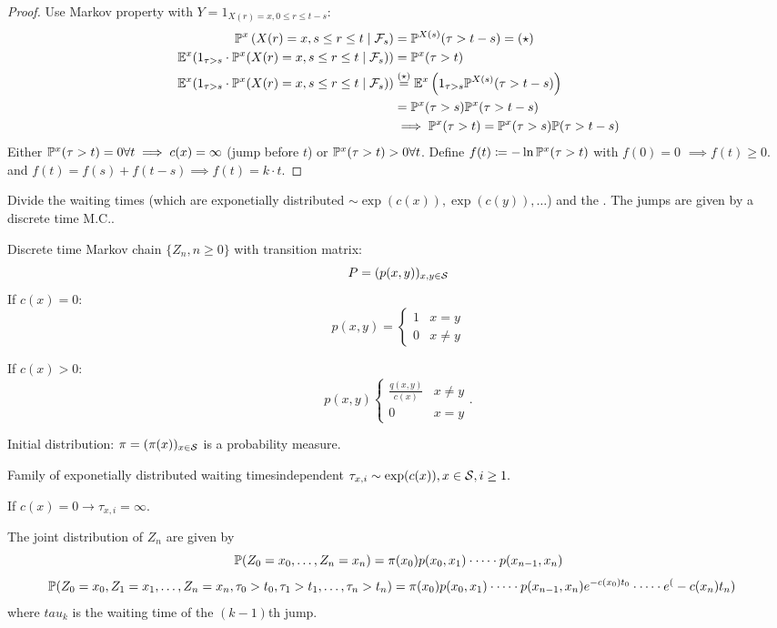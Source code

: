 \begin{proof}
    Use Markov property with \(Y=1_{X(r)=x,0\leq r\leq t-s}\):
    \begin{align*}
        \mathbb{P}^x\left(X(r)=x,s\leq r\leq t\mid \mathcal{F}_s\right)&=\mathbb{P}^{X(s)}(\tau>t-s)=(\star)\\
        \mathbb{E}^x(1_{\tau>s}\cdot \mathbb{P}^x(X(r)=x,s\leq r \leq t\mid \mathcal{F}_s))&=\mathbb{P}^x(\tau>t)\\
        \mathbb{E}^x(1_{\tau>s}\cdot \mathbb{P}^x(X(r)=x,s\leq r \leq t\mid \mathcal{F}_s))&\stackrel{(\star)}{=}\mathbb{E}^x\left(1_{\tau>s}\mathbb{P}^{X(s)}(\tau>t-s)\right)\\
        &=\mathbb{P}^x(\tau>s)\mathbb{P}^x(\tau>t-s)\\
        &\implies \mathbb{P}^x(\tau>t)=\mathbb{P}^x(\tau>s)\mathbb{P}(\tau>t-s)
    \end{align*}
    Either \(\mathbb{P}^x(\tau>t)=0\forall t\implies c(x)=\infty\) (jump before \(t\)) or \(\mathbb{P}^x(\tau>t)>0\forall t\).
    Define \(f(t)\coloneqq -\ln\mathbb{P}^x(\tau >t)\) with \(f(0)=0\) \(\implies f(t) \geq 0\).
    and  \(f(t)=f(s)+f(t-s)\implies f(t)=k\cdot t\).
\end{proof}

 Divide the waiting times (which are exponetially distributed \(\sim \exp(c(x)),\exp(c(y)),\dots\)) and the .
The jumps are given by a discrete time M.C..  

 Discrete time Markov chain \(\{Z_n,n\geq 0\}\) with transition matrix:
\[P=(p(x,y))_{x,y\in\mathcal{S}}\]
If \(c(x)=0\):\[ p(x,y)=\begin{cases}
   1&x=y\\ 
    0&x\neq y
\end{cases}\]

If \(c(x)>0\):
\[p(x,y)\begin{cases}
    \frac{q(x,y)}{c(x)} & x\neq y\\
    0 & x=y
\end{cases}.\]

 Initial distribution: \(\pi=(\pi(x))_{x\in\mathcal{S}}\) is a probability measure.

 Family of  exponetially distributed waiting timesindependent \(\tau_{x,i}\sim\exp(c(x)),x\in\mathcal{S},i\geq 1.\)

If \(c(x)=0\to \tau_{x,i}=\infty\).

The joint distribution of \(Z_n\) are given by 
\[\mathbb{P}(Z_0=x_0,\dots,Z_n=x_n)=\pi(x_0)p(x_0,x_1)\cdot\dots\cdot p(x_{n-1},x_n)\]
\begin{align*}
    \mathbb{P}(Z_0=x_0,Z_1=x_1,\dots,Z_n=x_n,\tau_0>t_0,\tau_1>t_1,\dots,\tau_n>t_n) & =\pi(x_0)p(x_0,x_1)\cdot \dots\cdot p(x_{n-1},x_n)e^{-c(x_0)t_0}\cdot\dots\cdot e^(-c(x_n)t_n)
\end{align*}
where \(tau_k\) is the waiting time of the \((k-1)\)th jump.

